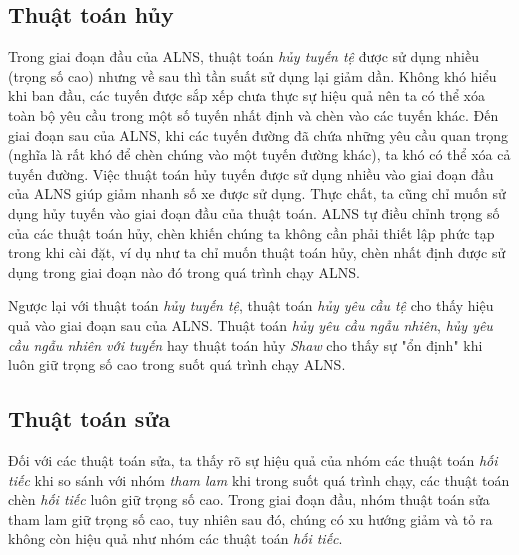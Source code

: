 \subsection*{Thuật toán hủy}
Trong giai đoạn đầu của ALNS, thuật toán \textit{hủy tuyến tệ} được sử dụng nhiều (trọng số cao) nhưng về sau thì tần suất sử dụng lại giảm dần. Không khó hiểu khi ban đầu, các tuyến được sắp xếp chưa thực sự hiệu quả nên ta có thể xóa toàn bộ yêu cầu trong một số tuyến nhất định và chèn vào các tuyến khác. Đến giai đoạn sau của ALNS, khi các tuyến đường đã chứa những yêu cầu quan trọng (nghĩa là rất khó để chèn chúng vào một tuyến đường khác), ta khó có thể xóa cả tuyến đường. Việc thuật toán hủy tuyến được sử dụng nhiều vào giai đoạn đầu của ALNS giúp giảm nhanh số xe được sử dụng. Thực chất, ta cũng chỉ muốn sử dụng hủy tuyến vào giai đoạn đầu của thuật toán. ALNS tự điều chỉnh trọng số của các thuật toán hủy, chèn khiến chúng ta không cần phải thiết lập phức tạp trong khi cài đặt, ví dụ như ta chỉ muốn thuật toán hủy, chèn nhất định được sử dụng trong giai đoạn nào đó trong quá trình chạy ALNS. 

Ngược lại với thuật toán \textit{hủy tuyến tệ}, thuật toán \textit{hủy yêu cầu tệ} cho thấy hiệu quả vào giai đoạn sau của ALNS. Thuật toán \textit{hủy yêu cầu ngẫu nhiên}, \textit{hủy yêu cầu ngẫu nhiên với tuyến} hay thuật toán hủy \textit{Shaw} cho thấy sự "ổn định" khi luôn giữ trọng số cao trong suốt quá trình chạy ALNS.

\subsection*{Thuật toán sửa}
Đối với các thuật toán sửa, ta thấy rõ sự hiệu quả của nhóm các thuật toán \textit{hối tiếc} khi so sánh với nhóm \textit{tham lam} khi trong suốt quá trình chạy, các thuật toán chèn \textit{hối tiếc} luôn giữ trọng số cao. Trong giai đoạn đầu, nhóm thuật toán sửa tham lam giữ trọng số cao, tuy nhiên sau đó, chúng có xu hướng giảm và tỏ ra không còn hiệu quả như nhóm các thuật toán \textit{hối tiếc}.

